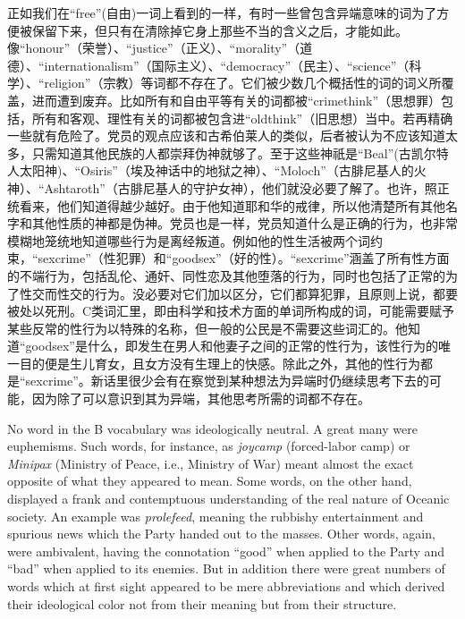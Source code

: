 \begin{paracol}{2}
\switchcolumn

正如我们在``free''(自由)一词上看到的一样，有时一些曾包含异端意味的词为了方便被保留下来，但只有在清除掉它身上那些不当的含义之后，才能如此。像``honour''（荣誉）、``justice''（正义）、``morality''（道德）、``internationalism''（国际主义）、``democracy''（民主）、``science''（科学）、``religion''（宗教）等词都不存在了。它们被少数几个概括性的词的词义所覆盖，进而遭到废弃。比如所有和自由平等有关的词都被``crimethink''（思想罪）包括，所有和客观、理性有关的词都被包含进``oldthink''（旧思想）当中。若再精确一些就有危险了。党员的观点应该和古希伯莱人的类似，后者被认为不应该知道太多，只需知道其他民族的人都崇拜伪神就够了。至于这些神祇是``Beal''(古凯尔特人太阳神)、``Osiris''（埃及神话中的地狱之神）、``Moloch''（古腓尼基人的火神）、``Ashtaroth''（古腓尼基人的守护女神），他们就没必要了解了。也许，照正统看来，他们知道得越少越好。由于他知道耶和华的戒律，所以他清楚所有其他名字和其他性质的神都是伪神。党员也是一样，党员知道什么是正确的行为，也非常模糊地笼统地知道哪些行为是离经叛道。例如他的性生活被两个词约束，``sexcrime''（性犯罪）和``goodsex''（好的性）。``sexcrime''涵盖了所有性方面的不端行为，包括乱伦、通奸、同性恋及其他堕落的行为，同时也包括了正常的为了性交而性交的行为。没必要对它们加以区分，它们都算犯罪，且原则上说，都要被处以死刑。C类词汇里，即由科学和技术方面的单词所构成的词，可能需要赋予某些反常的性行为以特殊的名称，但一般的公民是不需要这些词汇的。他知道``goodsex''是什么，即发生在男人和他妻子之间的正常的性行为，该性行为的唯一目的便是生儿育女，且女方没有生理上的快感。除此之外，其他的性行为都是``sexcrime''。新话里很少会有在察觉到某种想法为异端时仍继续思考下去的可能，因为除了可以意识到其为异端，其他思考所需的词都不存在。

\switchcolumn*

No word in the B vocabulary was ideologically neutral. A great many were
euphemisms. Such words, for instance, as \emph{joycamp} (forced-labor
camp) or \emph{Minipax} (Ministry of Peace, i.e., Ministry of War) meant
almost the exact opposite of what they appeared to mean. Some words, on
the other hand, displayed a frank and contemptuous understanding of the
real nature of Oceanic society. An example was \emph{prolefeed}, meaning
the rubbishy entertainment and spurious news which the Party handed out
to the masses. Other words, again, were ambivalent, having the
connotation ``good'' when applied to the Party and ``bad'' when applied to
its enemies. But in addition there were great numbers of words which at
first sight appeared to be mere abbreviations and which derived their
ideological color not from their meaning but from their structure.


\end{paracol}
